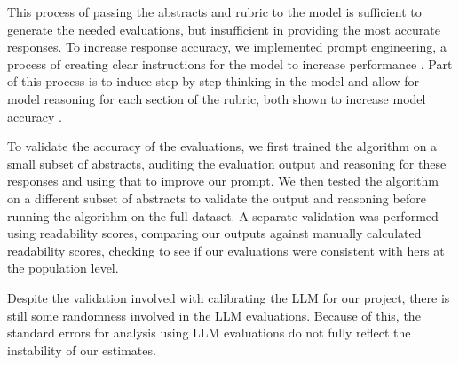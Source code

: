 This process of passing the abstracts and rubric to the model is sufficient to generate the needed evaluations, but insufficient in providing the most accurate responses. To increase response accuracy, we implemented prompt engineering, a process of creating clear instructions for the model to increase performance \parencite{openai_prompt_engineering}. Part of this process is to induce step-by-step thinking in the model and allow for model reasoning for each section of the rubric, both shown to increase model accuracy \parencite{zhang2022automaticchainthoughtprompting}.

To validate the accuracy of the evaluations, we first trained the algorithm on a small subset of abstracts, auditing the evaluation output and reasoning for these responses and using that to improve our prompt. We then tested the algorithm on a different subset of abstracts to validate the output and reasoning before running the algorithm on the full dataset. A separate validation was performed using readability scores, comparing our outputs against \textcite{hengel2022publishing} manually calculated readability scores, checking to see if our evaluations were consistent with hers at the population level. 

Despite the validation involved with calibrating the LLM for our project, there is still some randomness involved in the LLM evaluations. Because of this, the standard errors for analysis using LLM evaluations do not fully reflect the instability of our estimates.